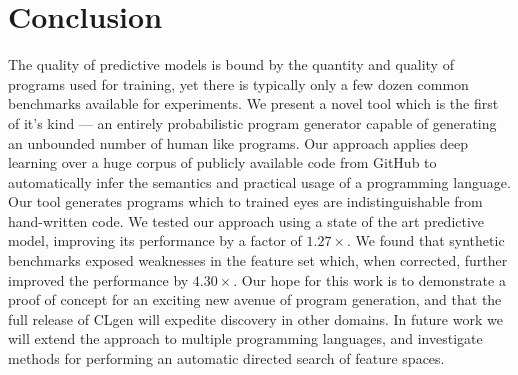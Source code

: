 \section{Conclusion}%
\label{sec:conclusion}

The quality of predictive models is bound by the quantity and quality of programs used for training, yet there is typically only a few dozen common benchmarks available for experiments. We present a novel tool which is the first of it's kind --- an entirely probabilistic program generator capable of generating an unbounded number of human like programs. Our approach applies deep learning over a huge corpus of publicly available code from GitHub to automatically infer the semantics and practical usage of a programming language. Our tool generates programs which to trained eyes are indistinguishable from hand-written code. We tested our approach using a state of the art predictive model, improving its performance by a factor of $1.27\times$. We found that synthetic benchmarks exposed weaknesses in the feature set which, when corrected, further improved the performance by $4.30\times$. Our hope for this work is to demonstrate a proof of concept for an exciting new avenue of program generation, and that the full release of CLgen will expedite discovery in other domains. In future work we will extend the approach to multiple programming languages, and investigate methods for performing an automatic directed search of feature spaces.
